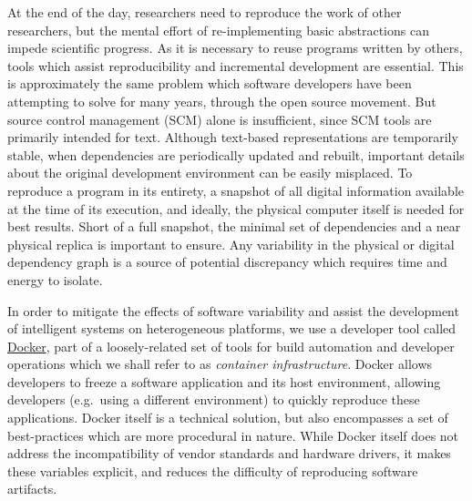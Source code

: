 \documentclass[12pt,initial,twoside,maitrise]{dms}
\numberwithin{equation}{section}
\numberwithin{table}{chapter}
\numberwithin{figure}{chapter}
\begin{document}
At the end of the day, researchers need to reproduce the work of other researchers, but the mental effort of re-implementing basic abstractions can impede scientific progress. As it is necessary to reuse programs written by others, tools which assist reproducibility and incremental development are essential. This is approximately the same problem which software developers have been attempting to solve for many years, through the open source movement. But source control management (SCM) alone is insufficient, since SCM tools are primarily intended for text. Although text-based representations are temporarily stable, when dependencies are periodically updated and rebuilt, important details about the original development environment can be easily misplaced. To reproduce a program in its entirety, a snapshot of all digital information available at the time of its execution, and ideally, the physical computer itself is needed for best results. Short of a full snapshot, the minimal set of dependencies and a near physical replica is important to ensure. Any variability in the physical or digital dependency graph is a source of potential discrepancy which requires time and energy to isolate.

In order to mitigate the effects of software variability and assist the development of intelligent systems on heterogeneous platforms, we use a developer tool called \href{https://www.docker.com}{Docker}, part of a loosely-related set of tools for build automation and developer operations which we shall refer to as \textit{container infrastructure}. Docker allows developers to freeze a software application and its host environment, allowing developers (e.g.~using a different environment) to quickly reproduce these applications. Docker itself is a technical solution, but also encompasses a set of best-practices which are more procedural in nature. While Docker itself does not address the incompatibility of vendor standards and hardware drivers, it makes these variables explicit, and reduces the difficulty of reproducing software artifacts.
\end{document}

